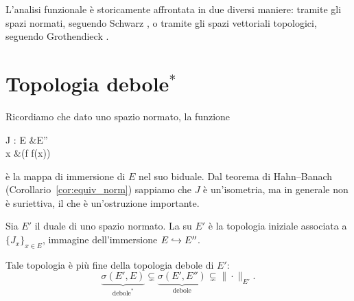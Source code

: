 L'analisi funzionale è storicamente affrontata in due diversi maniere: tramite gli spazi normati, seguendo Schwarz \cite{dunford1958linear,dunford1965linear}, o tramite gli spazi vettoriali topologici, seguendo Grothendieck \cite{grothendieck1973topological}.

\section{Topologia debole$^*$}
Ricordiamo che dato uno spazio normato, la funzione
\begin{eqalign}
	J : E &\longto E''\\
	x &\longmapsto (f \mapsto f(x))
\end{eqalign}
è la mappa di immersione di $E$ nel suo biduale. Dal teorema di Hahn--Banach (Corollario~\ref{cor:equiv_norm}) sappiamo che $J$ è un'isometria, ma in generale non è suriettiva, il che è un'ostruzione importante.

\begin{definition}
	Sia $E'$ il duale di uno spazio normato. La  su $E'$ è la topologia iniziale associata a $\{J_x\}_{x \in E}$, immagine dell'immersione $E \hookrightarrow E''$.
\end{definition}

\begin{remark}
	Tale topologia è più fine della topologia debole di $E'$:
	\begin{equation*}
		\underbrace{\sigma(E',E)}_{\text{debole}^*} \subsetneq \underbrace{\sigma(E',E'')}_{\text{debole}} \subsetneq \|\cdot\|_{E'}.
	\end{equation*}
\end{remark}


